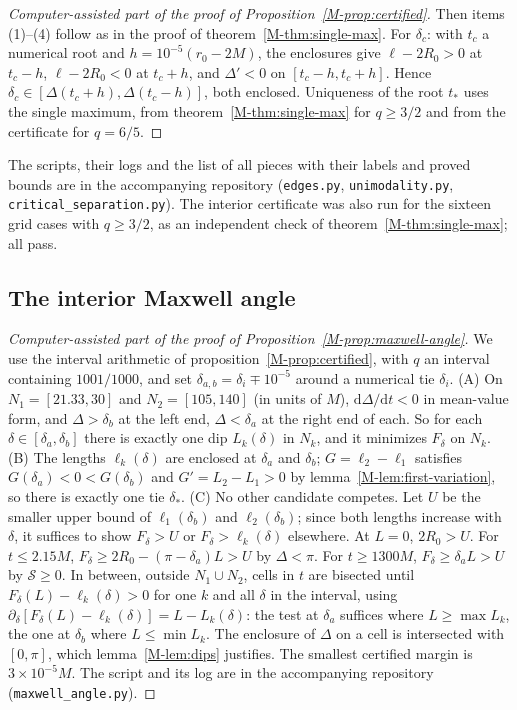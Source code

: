 \documentclass[aip,jmp,amsmath,amssymb,reprint]{revtex4-2}
\newcommand{\dd}{\mathrm{d}}
\theoremstyle{plain}
\theoremstyle{definition}
\begin{document}
\begin{proof}[Computer-assisted part of the proof of Proposition~\ref{M-prop:certified}]
Then items (1)--(4) follow as in the proof of theorem~\ref{M-thm:single-max}. For $\delta_c$: with $t_c$ a numerical
root and $h=10^{-5}(r_0-2M)$, the enclosures give $\ell-2R_0>0$ at $t_c-h$, $\ell-2R_0<0$ at
$t_c+h$, and $\Delta'<0$ on $[t_c-h,t_c+h]$. Hence
$\delta_c\in[\Delta(t_c+h),\Delta(t_c-h)]$, both enclosed. Uniqueness of the root
$t_*$ uses the single maximum, from theorem~\ref{M-thm:single-max} for $q\ge3/2$ and from the
certificate for $q=6/5$.
\end{proof}

The scripts, their logs and the list of all pieces with their labels and proved bounds are
in the accompanying repository (\texttt{edges.py}, \texttt{unimodality.py},
\texttt{critical\_separation.py}).
The interior certificate was also run for the sixteen grid cases with $q\ge3/2$, as an
independent check of theorem~\ref{M-thm:single-max}; all pass.

\subsection{The interior Maxwell angle}
\begin{proof}[Computer-assisted part of the proof of Proposition~\ref{M-prop:maxwell-angle}]
We use the interval arithmetic of proposition~\ref{M-prop:certified}, with $q$ an interval
containing $1001/1000$, and set $\delta_{a,b}=\delta_i\mp10^{-5}$ around a numerical tie
$\delta_i$. (A) On $N_1=[21.33,30]$ and $N_2=[105,140]$ (in units of $M$), $\dd\Delta/\dd t<0$ in
mean-value form, and $\Delta>\delta_b$ at the left end, $\Delta<\delta_a$ at the right end
of each. So for each $\delta\in[\delta_a,\delta_b]$ there is exactly one dip $L_k(\delta)$ in
$N_k$, and it minimizes $F_\delta$ on $N_k$. (B) The lengths $\ell_k(\delta)$ are enclosed at
$\delta_a$ and $\delta_b$; $G=\ell_2-\ell_1$ satisfies $G(\delta_a)<0<G(\delta_b)$ and
$G'=L_2-L_1>0$ by lemma~\ref{M-lem:first-variation}, so there is exactly one tie $\delta_*$.
(C) No other candidate competes. Let $U$ be the smaller upper bound of $\ell_1(\delta_b)$ and
$\ell_2(\delta_b)$; since both lengths increase with $\delta$, it suffices to show $F_\delta>U$
or $F_\delta>\ell_k(\delta)$ elsewhere. At $L=0$, $2R_0>U$. For $t\le2.15M$,
$F_\delta\ge2R_0-(\pi-\delta_a)L>U$ by $\Delta<\pi$. For $t\ge1300M$, $F_\delta\ge\delta_aL>U$ by
$\mathcal S\ge0$. In between, outside $N_1\cup N_2$, cells in $t$ are bisected until
$F_\delta(L)-\ell_k(\delta)>0$ for one $k$ and all $\delta$ in the interval, using
$\partial_\delta[F_\delta(L)-\ell_k(\delta)]=L-L_k(\delta)$: the test at $\delta_a$ suffices where
$L\ge\max L_k$, the one at $\delta_b$ where $L\le\min L_k$. The enclosure of $\Delta$ on a cell
is intersected with $[0,\pi]$, which lemma~\ref{M-lem:dips} justifies. The smallest certified
margin is $3\times10^{-5}M$. The script and its log are in the accompanying repository
(\texttt{maxwell\_angle.py}).
\end{proof}
\end{document}
